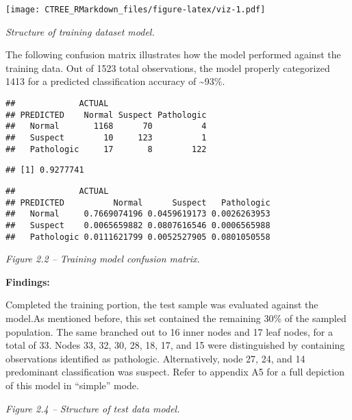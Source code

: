 \documentclass[
]{article}
\begin{document}
\texttt{[image: CTREE\_RMarkdown\_files/figure-latex/viz-1.pdf]}

\emph{Structure of training dataset model.}

The following confusion matrix illustrates how the model performed
against the training data. Out of 1523 total observations, the model
properly categorized 1413 for a predicted classification accuracy of
\textasciitilde93\%.

\begin{verbatim}
##             ACTUAL
## PREDICTED    Normal Suspect Pathologic
##   Normal       1168      70          4
##   Suspect        10     123          1
##   Pathologic     17       8        122
\end{verbatim}

\begin{verbatim}
## [1] 0.9277741
\end{verbatim}

\begin{verbatim}
##             ACTUAL
## PREDICTED          Normal      Suspect   Pathologic
##   Normal     0.7669074196 0.0459619173 0.0026263953
##   Suspect    0.0065659882 0.0807616546 0.0006565988
##   Pathologic 0.0111621799 0.0052527905 0.0801050558
\end{verbatim}

\emph{Figure 2.2 -- Training model confusion matrix.}

\textbf{Findings:}

Completed the training portion, the test sample was evaluated against
the model.As mentioned before, this set contained the remaining 30\% of
the sampled population. The same branched out to 16 inner nodes and 17
leaf nodes, for a total of 33. Nodes 33, 32, 30, 28, 18, 17, and 15 were
distinguished by containing observations identified as pathologic.
Alternatively, node 27, 24, and 14 predominant classification was
suspect. Refer to appendix A5 for a full depiction of this model in
``simple'' mode.

\emph{Figure 2.4 -- Structure of test data model.}
\end{document}
